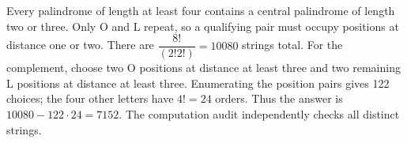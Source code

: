 Every palindrome of length at least four contains a central palindrome of length two or three. Only O and L repeat, so a qualifying pair must occupy positions at distance one or two. There are $\dfrac{8!}{(2!2!)}=10080$ strings total. For the complement, choose two O positions at distance at least three and two remaining L positions at distance at least three. Enumerating the position pairs gives 122 choices; the four other letters have $4!=24$ orders. Thus the answer is $10080-122\cdot24=\boxed{7152}$. The computation audit independently checks all distinct strings.
